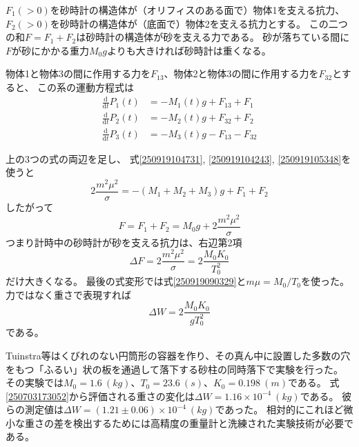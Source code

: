 \documentclass[dvipdfmx]{article}
\begin{document}
$F_1 (>0)$を砂時計の構造体が（オリフィスのある面で）物体1を支える抗力、
$F_2 (>0)$を砂時計の構造体が（底面で）物体2を支える抗力とする。
この二つの和$F=F_1+F_2$は砂時計の構造体が砂を支える力である。
砂が落ちている間に$F$が砂にかかる重力$M_0 g$よりも大きければ砂時計は重くなる。


物体1と物体3の間に作用する力を$F_{13}$、物体2と物体3の間に作用する力を$F_{32}$とすると、
この系の運動方程式は
\begin{align}
   \frac{\mathrm{d} }{\mathrm{d} t}  P_1(t) &=   - M_1(t) g + F_{13} + F_1\label{250703155015a}  \\
   \frac{\mathrm{d} }{\mathrm{d} t} P_2(t)  &=  - M_2(t) g  + F_{32} + F_2 \label{250703155015b} \\
   \frac{\mathrm{d} }{\mathrm{d} t} P_3(t) &=  - M_3(t) g  - F_{13} - F_{32} \label{250703155015c} 
\end{align}


上の3つの式の両辺を足し、
式\eqref{250919104731}, \eqref{250919104243}, \eqref{250919105348}を使うと
\begin{equation} \label{250917103450} 
  2\frac{m^2\mu^2}{\sigma}=  -(M_1+M_2+M_3) g + F_1 + F_2
\end{equation}
したがって
\begin{equation} \label{250919105951} 
   F = F_1 + F_2 = M_0 g +  2\frac{m^2\mu^2}{\sigma}
\end{equation}
つまり計時中の砂時計が砂を支える抗力は、右辺第2項
\begin{equation} \label{250703173105} 
   \Delta F  = 2 \frac{m^2\mu^2}{\sigma}  = 2 \frac{M_0K_0}{T_0^2} 
\end{equation}
だけ大きくなる。
最後の式変形では式\eqref{250919090329}と$m\mu=M_0/T_0$を使った。
力ではなく重さで表現すれば
\begin{equation} \label{250703173052} 
    \Delta W  =  2 \frac{M_0K_0}{gT_0^2} 
\end{equation}
である。


Tuinstra等はくびれのない円筒形の容器を作り、その真ん中に設置した多数の穴をもつ「ふるい」状の板を通過して落下する砂柱の同時落下で実験を行った\cite{Tuinstra2010-wk}。
その実験では$M_0=1.6~\si{(kg)}$、$T_0=23.6~\si{(s)}$、$K_0=0.198~\si{(m)}$である。
%
式\eqref{250703173052}から評価される重さの変化は$\Delta W = 1.16\times 10^{-4}~\si{(kg)}$である。
彼らの測定値は$\Delta W = (1.21\pm 0.06)\times 10^{-4}~\si{(kg)}$であった。
相対的にこれほど微小な重さの差を検出するためには高精度の重量計と洗練された実験技術が必要である。
\end{document}
